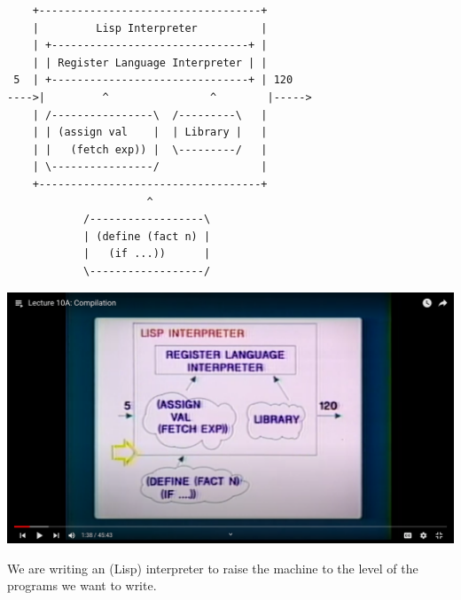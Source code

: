 \documentclass[a4paper,twoside]{article}
\numberwithin{equation}{section}
\begin{document}
\begin{lstlisting}
    +-----------------------------------+
    |         Lisp Interpreter          |
    | +-------------------------------+ |
    | | Register Language Interpreter | |
 5  | +-------------------------------+ | 120
---->|         ^                ^        |----->
    | /----------------\  /---------\   |
    | | (assign val    |  | Library |   |
    | |   (fetch exp)) |  \---------/   |
    | \----------------/                |
    +-----------------------------------+
                      ^
            /------------------\
            | (define (fact n) |
            |   (if ...))      |
            \------------------/
\end{lstlisting}
\begin{center}
    \includegraphics[scale = 0.2]{assets/lisp_interpreter.png}
\end{center}

We are writing an (Lisp) interpreter to raise the machine to the level of the programs we want to write.
\end{document}
